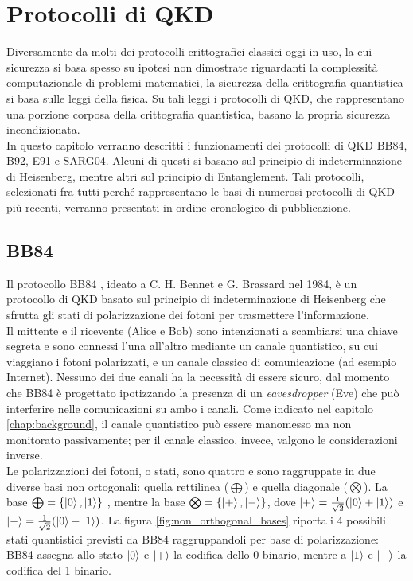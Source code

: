 \chapter{Protocolli di QKD}
\label{chap:protocolli_qkd}
Diversamente da molti dei protocolli crittografici classici oggi in uso, la cui sicurezza si basa spesso su ipotesi non dimostrate riguardanti la complessità computazionale di problemi matematici, la sicurezza della crittografia quantistica si basa sulle leggi della fisica. Su tali leggi i protocolli di QKD, che rappresentano una porzione corposa della crittografia quantistica, basano la propria sicurezza incondizionata.\\

In questo capitolo verranno descritti i funzionamenti dei protocolli di QKD BB84, B92, E91 e SARG04. Alcuni di questi si basano sul principio di indeterminazione di Heisenberg, mentre altri sul principio di Entanglement. Tali protocolli, selezionati fra tutti perché rappresentano le basi di numerosi protocolli di QKD più recenti, verranno presentati in ordine cronologico di pubblicazione.\\

\section{BB84}
Il protocollo BB84 \cite{bb84}, ideato a C. H. Bennet e G. Brassard nel 1984, è un protocollo di QKD basato sul principio di indeterminazione di Heisenberg che sfrutta gli stati di polarizzazione dei fotoni per trasmettere l'informazione.\\
Il mittente e il ricevente (Alice e Bob) sono intenzionati a scambiarsi una chiave segreta e sono connessi l'una all'altro mediante un canale quantistico, su cui viaggiano i fotoni polarizzati, e un canale classico di comunicazione (ad esempio Internet). Nessuno dei due canali ha la necessità di essere sicuro, dal momento che BB84 è progettato ipotizzando la presenza di un \textit{eavesdropper} (Eve) che può interferire nelle comunicazioni su ambo i canali. Come indicato nel capitolo \ref{chap:background}, il canale quantistico può essere manomesso ma non monitorato passivamente; per il canale classico, invece, valgono le considerazioni inverse.\\
Le polarizzazioni dei fotoni, o stati, sono quattro e sono raggruppate in due diverse basi non ortogonali: quella rettilinea ($\bigoplus$) e quella diagonale ($\bigotimes$). La base $\bigoplus = \{\ket{0}, \ket{1}\}$ , mentre la base $\bigotimes = \{\ket{+}, \ket{-}\}$, dove $\ket{+} = \frac{1}{\sqrt{2}}(\ket{0}+\ket{1})$ e $\ket{-} = \frac{1}{\sqrt{2}}(\ket{0}-\ket{1})$. La figura \ref{fig:non_orthogonal_bases} riporta i 4 possibili stati quantistici previsti da BB84 raggruppandoli per base di polarizzazione: BB84 assegna allo stato $\ket{0}$ e $\ket{+}$ la codifica dello 0 binario, mentre a $\ket{1}$ e $\ket{-}$ la codifica del 1 binario.

